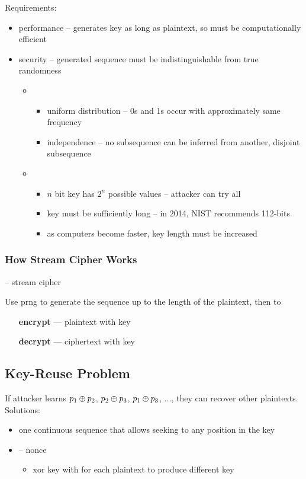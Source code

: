 \documentclass[draft]{article}
\begin{document}
Requirements:
\begin{itemize}[nosep]
    \item performance -- generates key as long as plaintext, so must be computationally efficient
    \item security -- generated sequence must be indistinguishable from true randomness
          \begin{itemize}
              \item {}
                    \begin{itemize}[nosep]
                        \item uniform distribution -- 0s and 1s occur with approximately same frequency
                        \item independence -- no subsequence can be inferred from another, disjoint subsequence
                    \end{itemize}
              \item {}
                    \begin{itemize}[nosep]
                        \item $n$ bit key has $2^n$ possible values -- attacker can try all
                        \item key must be sufficiently long -- in 2014, NIST recommends 112-bits
                        \item as computers become faster, key length must be increased
                    \end{itemize}
          \end{itemize}
\end{itemize}

\subsubsection*{How Stream Cipher Works}
 -- \glsdesc*{stream cipher}

Use \acrshort{prng} to generate the sequence up to the length of the plaintext, then to
\begin{itemize}[nosep, align=left, leftmargin=1in]
    \item[\textbf{encrypt} ---]  plaintext with key
    \item[\textbf{decrypt} ---]  ciphertext with key
\end{itemize}
\subsection{Key-Reuse Problem}
If attacker learns $p_1 \oplus p_2$, $p_2 \oplus p_3$, $p_1 \oplus p_3$, $\dots$, they can recover other plaintexts.
Solutions:
\begin{itemize}[nosep]
    \item one continuous sequence that allows seeking to any position in the key
    \item {} -- \glsdesc{nonce}
          \begin{itemize}[nosep]\item xor key with  for each plaintext to produce different key\end{itemize}
\end{itemize}
\end{document}
